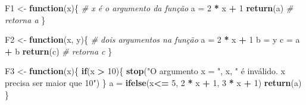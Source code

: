 \documentclass[
]{book}
\newenvironment{Shaded}{\begin{snugshade}}{\end{snugshade}}
\newcommand{\CommentTok}[1]{\textcolor[rgb]{0.56,0.35,0.01}{\textit{#1}}}
\newcommand{\ControlFlowTok}[1]{\textcolor[rgb]{0.13,0.29,0.53}{\textbf{#1}}}
\newcommand{\DecValTok}[1]{\textcolor[rgb]{0.00,0.00,0.81}{#1}}
\newcommand{\KeywordTok}[1]{\textcolor[rgb]{0.13,0.29,0.53}{\textbf{#1}}}
\newcommand{\NormalTok}[1]{#1}
\newcommand{\OperatorTok}[1]{\textcolor[rgb]{0.81,0.36,0.00}{\textbf{#1}}}
\newcommand{\StringTok}[1]{\textcolor[rgb]{0.31,0.60,0.02}{#1}}
\numberwithin{equation}{section}
\begin{document}
\begin{Shaded}
\begin{Highlighting}[]
\NormalTok{F1 \textless{}{-}}\StringTok{ }\ControlFlowTok{function}\NormalTok{(x)\{ }\CommentTok{\# x é o argumento da função}
\NormalTok{  a =}\StringTok{ }\DecValTok{2} \OperatorTok{*}\StringTok{ }\NormalTok{x }\OperatorTok{+}\StringTok{ }\DecValTok{1}
  \KeywordTok{return}\NormalTok{(a) }\CommentTok{\# retorna a}
\NormalTok{\}}

\NormalTok{F2 \textless{}{-}}\StringTok{ }\ControlFlowTok{function}\NormalTok{(x, y)\{ }\CommentTok{\# dois argumentos na função}
\NormalTok{  a =}\StringTok{ }\DecValTok{2} \OperatorTok{*}\StringTok{ }\NormalTok{x }\OperatorTok{+}\StringTok{ }\DecValTok{1}
\NormalTok{  b =}\StringTok{ }\NormalTok{y}
\NormalTok{  c =}\StringTok{ }\NormalTok{a }\OperatorTok{+}\StringTok{ }\NormalTok{b}
  \KeywordTok{return}\NormalTok{(c) }\CommentTok{\# retorna c}
\NormalTok{\}}

\NormalTok{F3 \textless{}{-}}\StringTok{ }\ControlFlowTok{function}\NormalTok{(x)\{}
  \ControlFlowTok{if}\NormalTok{(x }\OperatorTok{\textgreater{}}\StringTok{ }\DecValTok{10}\NormalTok{)\{}
    \KeywordTok{stop}\NormalTok{(}\StringTok{"O argumento x = "}\NormalTok{, x, }\StringTok{" é inválido. \textquotesingle{}x\textquotesingle{} precisa ser maior que 10"}\NormalTok{)}
\NormalTok{  \}}
\NormalTok{  a =}\StringTok{ }\KeywordTok{ifelse}\NormalTok{(x}\OperatorTok{\textless{}=}\StringTok{ }\DecValTok{5}\NormalTok{, }\DecValTok{2} \OperatorTok{*}\StringTok{ }\NormalTok{x }\OperatorTok{+}\StringTok{ }\DecValTok{1}\NormalTok{, }\DecValTok{3} \OperatorTok{*}\StringTok{ }\NormalTok{x }\OperatorTok{+}\StringTok{ }\DecValTok{1}\NormalTok{)}
  \KeywordTok{return}\NormalTok{(a)}
\NormalTok{\}}


\end{Highlighting}
\end{Shaded}
\end{document}

